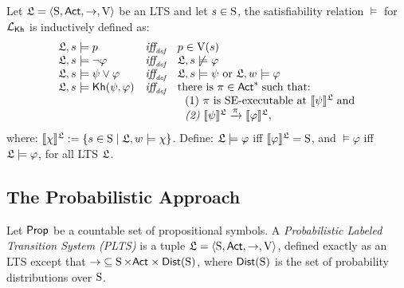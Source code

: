\begin{definition} \label{def:semantics-kh}
    Let $\model = \tup{\S,\ACT,\ra,\V}$ be an LTS and let $s\in\S$, the satisfiability relation $\models$ for $\Khlogic$ is inductively defined as:
    \[
    \begin{array}{l@{\ \ \ }c@{\ \ \  }l}
    \model, s \models p & \iffdef & p \in \V(s) \\
    \model, s\models \neg\varphi & \iffdef & \model, s \not\models \varphi \\
    \model, s \models \psi\vee\varphi & \iffdef & \model, s \models \psi \mbox{ or }\model, w \models \varphi \\
    \model, s \models \kh(\psi,\varphi) & \iffdef & \text{there is } \plan \in \ACT^* \;\text{such that:} \\
    & & \ \ \text{\rm (1)} \ \plan \text{ is SE-executable at }  \truthset{\model}{\psi}\; \text{and} \\
    & & \ \ \text{\em (2)} \ \truthset{\model}{\psi} \reach{\plan} \truthset{\model}{\varphi}, 
    \end{array}
    \]      where: $\truthset{\model}{\chi} := \csetsc{s\in\S}{\model,w\models\chi}$. Define: $\model\models\varphi$ iff  $\truthset{\model}{\varphi}=\S$, and $\models\varphi$ iff $\model\models\varphi$, for all LTS $\model$.
\end{definition}

\subsection{The Probabilistic Approach}

\begin{definition}\label{def:plts}
    Let $\PROP$ be a countable set of propositional symbols. 
    A \emph{Probabilistic Labeled Transition System (PLTS)}  is a tuple
    $\model=\tup{\S,\ACT,\ra,\V}$, defined exactly as an LTS except that ${\ra}\subseteq \S \times \ACT \times \dist(\S)$, where  $\dist(\S)$ is the set of probability distributions over $\S$.
\end{definition}

